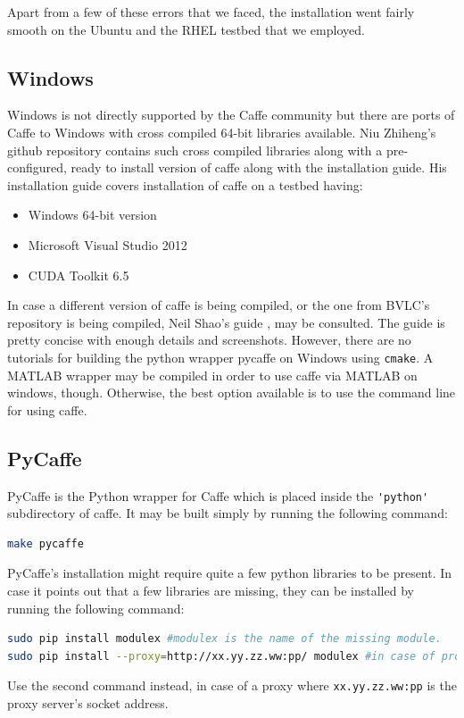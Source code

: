 \documentclass{article}
\begin{document}
Apart from a few of these errors that we faced, the installation went fairly smooth on the Ubuntu and the RHEL testbed that we employed.

\subsection{Windows}
Windows is not directly supported by the Caffe community but there are ports of Caffe to Windows with cross compiled 64-bit libraries available. Niu Zhiheng's github repository \cite{nz} contains such cross compiled libraries along with a pre-configured, ready to install version of caffe along with the installation guide. His installation guide covers installation of caffe on a testbed having:
\begin{itemize}
	\item Windows 64-bit version
	\item Microsoft Visual Studio 2012
	\item CUDA Toolkit 6.5
\end{itemize}

In case a different version of caffe is being compiled, or the one from BVLC's repository is being compiled, Neil Shao's guide \cite{neil}, may be consulted. The guide is pretty concise with enough details and screenshots. However, there are no tutorials for building the python wrapper pycaffe on Windows using \texttt{cmake}. A MATLAB wrapper may be compiled in order to use caffe via MATLAB on windows, though. Otherwise, the best option available is to use the command line for using caffe.

\subsection{PyCaffe}
PyCaffe is the Python wrapper for Caffe which is placed inside the \verb|'python'| subdirectory of caffe. It may be built simply by running the following command:
\begin{lstlisting}[tabsize=4,language=bash,breaklines]
make pycaffe
\end{lstlisting}

PyCaffe's installation might require quite a few python libraries to be present. In case it points out that a few libraries are missing, they can be installed by running the following command:
\begin{lstlisting}[tabsize=4,language=bash,breaklines]
sudo pip install modulex #modulex is the name of the missing module.
sudo pip install --proxy=http://xx.yy.zz.ww:pp/ modulex #in case of proxy
\end{lstlisting}
Use the second command instead, in case of a proxy where \texttt{xx.yy.zz.ww:pp} is the proxy server's socket address.
\end{document}
